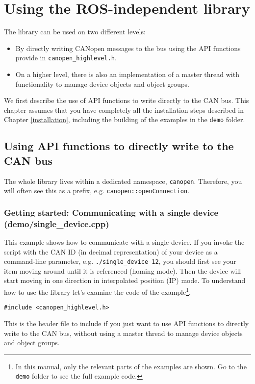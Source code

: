 \chapter{Using the ROS-independent library}
\label{chap:rosindependentlibrary}

The library can be used on two different levels:
\begin{itemize}
\item By directly writing CANopen messages to the bus using the API functions provide in \texttt{canopen\_highlevel.h}.
\item On a higher level, there is also an implementation of a master thread with functionality to manage device objects and object groups.
\end{itemize}

We first describe the use of API functions to write directly to the CAN bus. This chapter assumes that you have completely all the installation steps described in Chapter \ref{installation}, including the building of the examples in the \texttt{demo} folder.

\section{Using API functions to directly write to the CAN bus}

The whole library lives within a dedicated namespace, \texttt{canopen}. Therefore, you will often see this as a prefix, e.g. \texttt{canopen::openConnection}.

\subsection{Getting started: Communicating with a single device (demo/single\_device.cpp)}

This example shows how to communicate with a single device. If you invoke the script with the CAN ID (in decimal representation) of your device as a command-line parameter, e.g. \texttt{./single\_device 12}, you should first see your item moving around until it is referenced (homing mode). Then the device will start moving in one direction in interpolated position (IP) mode. To understand how to use the library let's examine the code of the example\footnote{In this manual, only the relevant parts of the examples are shown. Go to the \texttt{demo} folder to see the full example code.}.

\begin{verbatim}
#include <canopen_highlevel.h>
\end{verbatim}
This is the header file to include if you just want to use API functions to directly write to the CAN bus, without using a master thread to manage device objects and object groups.

